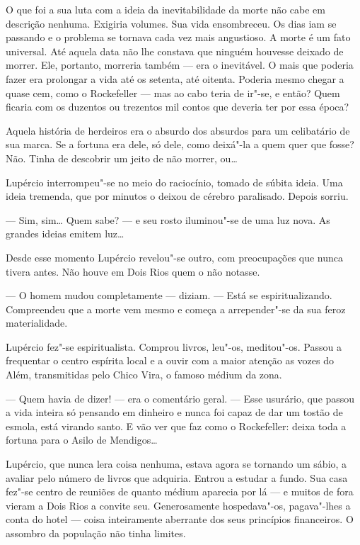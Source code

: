 O que foi a sua luta com a ideia da inevitabilidade da morte não cabe em
descrição nenhuma. Exigiria volumes. Sua vida ensombreceu. Os dias iam
se passando e o problema se tornava cada vez mais angustioso. A morte é
um fato universal. Até aquela data não lhe constava que ninguém houvesse
deixado de morrer. Ele, portanto, morreria também --- era o inevitável.
O mais que poderia fazer era prolongar a vida até os setenta, até
oitenta. Poderia mesmo chegar a quase cem, como o Rockefeller --- mas ao
cabo teria de ir"-se, e então? Quem ficaria com os duzentos ou trezentos
mil contos que deveria ter por essa época?

Aquela história de herdeiros era o absurdo dos absurdos para um
celibatário de sua marca. Se a fortuna era dele, só dele, como deixá"-la
a quem quer que fosse? Não. Tinha de descobrir um jeito de não morrer,
ou\ldots{}

Lupércio interrompeu"-se no meio do raciocínio, tomado de súbita ideia.
Uma ideia tremenda, que por minutos o deixou de cérebro paralisado.
Depois sorriu.

--- Sim, sim\ldots{} Quem sabe? --- e seu rosto iluminou"-se de uma luz nova.
As grandes ideias emitem luz\ldots{}

Desde esse momento Lupércio revelou"-se outro, com preocupações que nunca
tivera antes. Não houve em Dois Rios quem o não notasse.

--- O homem mudou completamente --- diziam. --- Está se
espiritualizando. Compreendeu que a morte vem mesmo e começa a
arrepender"-se da sua feroz materialidade.

Lupércio fez"-se espiritualista. Comprou livros, leu"-os, meditou"-os.
Passou a frequentar o centro espírita local e a ouvir com a maior
atenção as vozes do Além, transmitidas pelo Chico Vira, o famoso médium
da zona.

--- Quem havia de dizer! --- era o comentário geral. --- Esse usurário,
que passou a vida inteira só pensando em dinheiro e nunca foi capaz de
dar um tostão de esmola, está virando santo. E vão ver que faz como o
Rockefeller: deixa toda a fortuna para o Asilo de Mendigos\ldots{}

Lupércio, que nunca lera coisa nenhuma, estava agora se tornando um
sábio, a avaliar pelo número de livros que adquiria. Entrou a estudar a
fundo. Sua casa fez"-se centro de reuniões de quanto médium aparecia por
lá --- e muitos de fora vieram a Dois Rios a convite seu. Generosamente
hospedava"-os, pagava"-lhes a conta do hotel --- coisa inteiramente
aberrante dos seus princípios financeiros. O assombro da população não
tinha limites.

